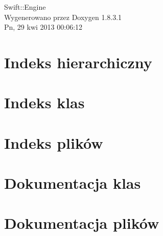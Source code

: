 \documentclass{book}
\begin{document}
\hypersetup{pageanchor=false,citecolor=blue}
\begin{titlepage}
\vspace*{7cm}
\begin{center}
{\Large Swift\-:\-:Engine }\\
\vspace*{1cm}
{\large Wygenerowano przez Doxygen 1.8.3.1}\\
\vspace*{0.5cm}
{\small Pn, 29 kwi 2013 00:06:12}\\
\end{center}
\end{titlepage}
\clearemptydoublepage
{}
\tableofcontents
\clearemptydoublepage
{}
\hypersetup{pageanchor=true,citecolor=blue}
\chapter{Indeks hierarchiczny}

\chapter{Indeks klas}

\chapter{Indeks plików}

\chapter{Dokumentacja klas}















\chapter{Dokumentacja plików}


\printindex
\end{document}
